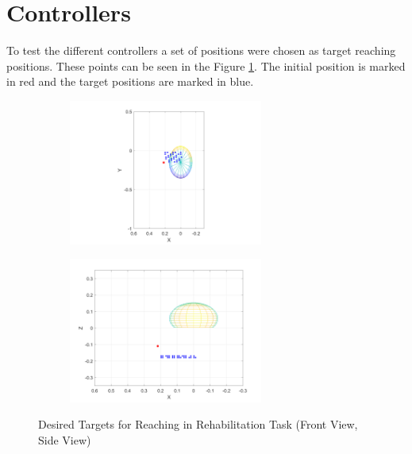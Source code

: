 \section{Controllers}
To test the different controllers a set of positions were chosen as target reaching positions. These points can be seen in the Figure \ref{fig:desiredpoints}. The initial position is marked in red and the target positions are marked in blue.

\begin{figure}[h!] 
    \centering
    \begin{subfigure}[b]{0.45\linewidth}
        \centering

        \includegraphics[width=0.7\textwidth]{Pictures/Results/Controller/DesiredPointsFV.png}
    \end{subfigure}
    \hfill
    \begin{subfigure}[b]{0.45\linewidth}       
        \centering

        \includegraphics[width=0.7\textwidth]{Pictures/Results/Controller/DesiredPointsSV.png}
    \end{subfigure}
    \caption{Desired Targets for Reaching in Rehabilitation Task (Front View, Side View)}
    \label{fig:desiredpoints}
\end{figure}

